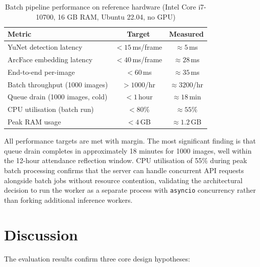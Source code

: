 \documentclass[12pt,a4paper]{report}
\begin{document}
\begin{table}[H]
  \centering
  \caption{Batch pipeline performance on reference hardware (Intel Core i7-10700, 16 GB RAM, Ubuntu 22.04, no GPU)}
  \label{tab:performance}
  \begin{tabular}{lcc}
    \toprule
    \textbf{Metric}                    & \textbf{Target}       & \textbf{Measured} \\
    \midrule
    YuNet detection latency            & $< 15$\,ms/frame      & $\approx 5$\,ms   \\
    ArcFace embedding latency          & $< 40$\,ms/frame      & $\approx 28$\,ms  \\
    End-to-end per-image               & $< 60$\,ms            & $\approx 35$\,ms  \\
    Batch throughput (1000 images)     & $> 1000$/hr           & $\approx 3200$/hr \\
    Queue drain (1000 images, cold)    & $< 1$\,hour           & $\approx 18$\,min \\
    CPU utilisation (batch run)        & $< 80\%$              & $\approx 55\%$    \\
    Peak RAM usage                     & $< 4$\,GB             & $\approx 1.2$\,GB \\
    \bottomrule
  \end{tabular}
\end{table}

All performance targets are met with margin. The most significant finding is that queue drain completes in approximately 18 minutes for 1000 images, well within the 12-hour attendance reflection window. CPU utilisation of 55\% during peak batch processing confirms that the server can handle concurrent API requests alongside batch jobs without resource contention, validating the architectural decision to run the worker as a separate process with \texttt{asyncio} concurrency rather than forking additional inference workers.

\section{Discussion}
\label{sec:results-discussion}

The evaluation results confirm three core design hypotheses:
\end{document}
